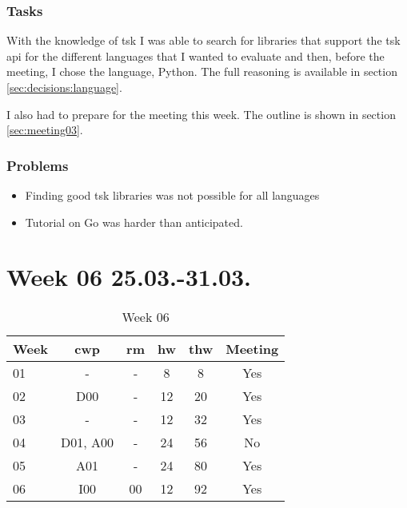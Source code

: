 \subsubsection{Tasks}

With the knowledge of \gls{tsk} I was able to search for libraries that support the \gls{tsk} \gls{api} for the different languages that I wanted to evaluate and then, before the meeting, I chose the language, Python. The full reasoning is available in section \ref{sec:decisions:language}.

I also had to prepare for the meeting this week. The outline is shown in section \ref{sec:meeting03}.

\subsubsection{Problems}

\begin{itemize}
    \item Finding good \gls{tsk} libraries was not possible for all languages
    \item Tutorial on Go was harder than anticipated.
\end{itemize}

\section{Week 06 25.03.-31.03.}
\label{sec:journal:week06}

\begin{table}[!ht]
    \begin{center}
        \caption{Week 06}
        \label{tab:journal:week06}
        \begin{tabular}{l|c|c|c|c|c}
            \textbf{Week} & \textbf{\gls{cwp}} & \textbf{\gls{rm}} & \textbf{\gls{hw}} & \textbf{\gls{thw}} & \textbf{Meeting}\\
        \hline
        01 & - & - & 8 & 8 & Yes \\
        02 & D00 & - & 12 & 20 & Yes \\
        03 & - & - & 12 & 32 & Yes \\
        04 & D01, A00 & - & 24 & 56 & No \\
        05 & A01 & - & 24 & 80 & Yes \\
        06 & I00 & 00 & 12 & 92 & Yes \\
        \end{tabular}
    \end{center}
\end{table}

